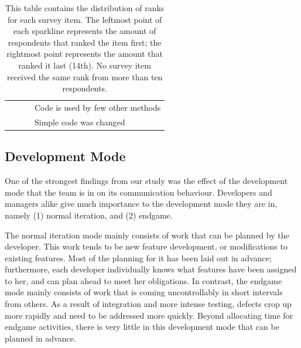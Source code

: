 \begin{table}[t!]
\begin{tabular}{ll}
\vspace{-2pt}\includegraphics[height=10px, width=30px]{figures/sparkles/code-is-used-by-a-few-other-methods.pdf} & Code is used by few other methods\\ 
\vspace{-2pt}\includegraphics[height=10px, width=30px]{figures/sparkles/simple-code-was-changed.pdf} & Simple code was changed\\
\bottomrule
\end{tabular}
\vspace{-5pt}
\caption{This table contains the distribution of ranks for each survey item. The leftmost point of each sparkline represents the amount of respondents that ranked the item first; the rightmost point represents the amount that ranked it last (14th). No survey item received the same rank from more than ten respondents.}
\label{tab:sparkle}
\vspace{-20pt}
\end{table}




\subsection{Development Mode}

One of the strongest findings from our study was the effect of the development mode that the team is in on its communication behaviour. Developers and managers alike give much importance to the development mode they are in, namely (1) normal iteration, and (2) endgame.

The normal iteration mode mainly consists of work that can be planned by the developer. This work tends to be new feature development, or modifications to existing features. Most of the planning for it has been laid out in advance; furthermore, each developer individually knows what features have been assigned to her, and can plan ahead to meet her obligations.
In contrast, the endgame mode mainly consists of work that is coming uncontrollably in short intervals from others. As a result of integration and more intense testing, defects crop up more rapidly and need to be addressed more quickly. Beyond allocating time for endgame activities, there is very little in this development mode that can be planned in advance.


